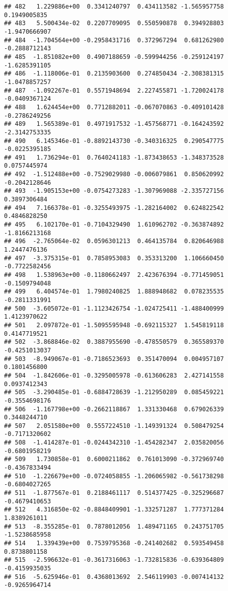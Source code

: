\documentclass[
]{article}
\begin{document}
\begin{verbatim}
## 482   1.229886e+00  0.3341240797  0.434113582 -1.565957758  0.1949005835
## 483   5.500434e-02  0.2207709095  0.550590878  0.394928803 -1.9470666907
## 484  -1.704564e+00 -0.2958431716  0.372967294  0.681262980 -0.2888712143
## 485  -1.851082e+00  0.4907188659 -0.599944256 -0.259124197 -1.6285391105
## 486  -1.118006e-01  0.2135903600  0.274850434 -2.308381315 -1.0478857257
## 487  -1.092267e-01  0.5571948694  2.227455871 -1.720024178 -0.0409367124
## 488   1.624454e+00  0.7712882011 -0.067070863 -0.409101428 -0.2786249256
## 489   1.565389e-01  0.4971917532 -1.457568771 -0.164243592 -2.3142753335
## 490   6.145346e-01 -0.8892143730 -0.340316325  0.290547775 -0.0225395185
## 491   1.736294e-01  0.7640241183 -1.873438653 -1.348373528  0.0757445974
## 492  -1.512488e+00 -0.7529029980 -0.006079861  0.850620992 -0.2042128646
## 493  -1.905153e+00 -0.0754273283 -1.307969088 -2.335727156  0.3897306484
## 494   7.166378e-01 -0.3255493975 -1.282164002  0.624822542  0.4846828250
## 495   6.102170e-01 -0.7104329490  1.610962702 -0.363874892 -1.8166213168
## 496  -2.765064e-02  0.0596301213  0.464135784  0.820646988  1.2447476136
## 497  -3.375315e-01  0.7858953083  0.353313200  1.106660450 -0.7722582456
## 498   1.538963e+00 -0.1180662497  2.423676394 -0.771459051 -0.1509794048
## 499   6.404574e-01  1.7980240825  1.888948682  0.078235535 -0.2811331991
## 500  -3.605072e-01 -1.1123426754 -1.024725411 -1.488400999  1.4123970622
## 501   2.097872e-01 -1.5095595948 -0.692115327  1.545819118  0.4147719521
## 502  -3.868846e-02  0.3887955690 -0.478550579  0.365589370 -0.4251013037
## 503  -8.949067e-01 -0.7186523693  0.351470094  0.004957107  0.1801456800
## 504  -1.842606e-01 -0.3295005978 -0.613606283  2.427141558  0.0937412343
## 505  -3.290485e-01 -0.6884728639 -1.212950289  0.085459221 -0.3554698176
## 506  -1.167798e+00 -0.2662118867  1.331330468  0.679026339  0.3448244710
## 507   2.051580e+00  0.5557224510 -1.149391324  0.508479254 -0.7171320602
## 508  -1.414287e-01 -0.0244342310 -1.454282347  2.035820056 -0.6801958219
## 509   1.730858e-01  0.6000211862  0.761013090 -0.372969740 -0.4367833494
## 510  -1.226679e+00 -0.0724058855 -1.206065982 -0.561738298 -0.6804027265
## 511  -1.877567e-01  0.2188461117  0.514377425 -0.325296687 -0.4679410653
## 512   4.316850e-02 -0.8848409901 -1.332571287  1.777371284  1.8389261011
## 513  -8.355285e-01  0.7878012056  1.489471165  0.243751705 -1.5238685958
## 514   1.339439e+00  0.7539795368 -0.241402682  0.593549458  0.8738801158
## 515  -2.596632e-01 -0.3617316063 -1.732815836 -0.639364809 -0.4159935035
## 516  -5.625946e-01  0.4368013692  2.546119903 -0.007414132 -0.9265964714

\end{verbatim}
\end{document}
